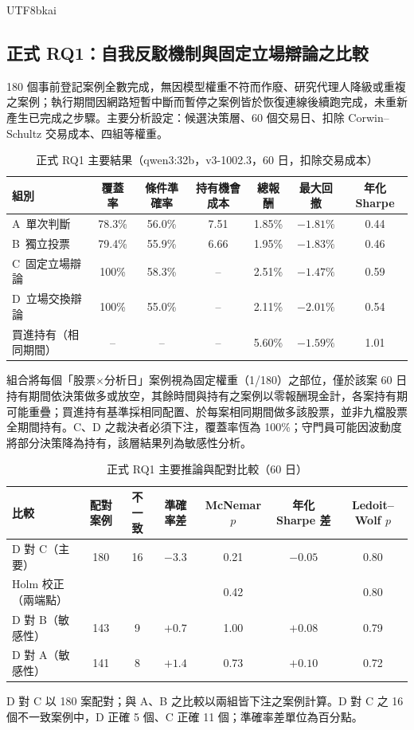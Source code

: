 \documentclass[12pt,a4paper]{article}
\newcommand{\grp}[1]{\textsf{#1}}
\begin{document}
\begin{CJK}{UTF8}{bkai}
\subsection{正式 RQ1：自我反駁機制與固定立場辯論之比較}
\label{sec:formalresults}

180 個事前登記案例全數完成，無因模型權重不符而作廢、研究代理人降級或重複之案例；執行期間因網路短暫中斷而暫停之案例皆於恢復連線後續跑完成，未重新產生已完成之步驟。主要分析設定：候選決策層、60 個交易日、扣除 Corwin--Schultz 交易成本、四組等權重。

\begin{table}[H]
\centering\small
\caption{正式 RQ1 主要結果（qwen3:32b，v3-1002.3，60 日，扣除交易成本）}
\label{tab:formalmain}
\begin{tabular}{@{}lcccccc@{}}
\toprule
組別 & 覆蓋率 & 條件準確率 & 持有機會成本 & 總報酬 & 最大回撤 & 年化 Sharpe \\
\midrule
\grp{A}\ 單次判斷 & 78.3\% & 56.0\% & 7.51 & 1.85\% & $-1.81\%$ & 0.44 \\
\grp{B}\ 獨立投票 & 79.4\% & 55.9\% & 6.66 & 1.95\% & $-1.83\%$ & 0.46 \\
\grp{C}\ 固定立場辯論 & 100\% & 58.3\% & -- & 2.51\% & $-1.47\%$ & 0.59 \\
\grp{D}\ 立場交換辯論 & 100\% & 55.0\% & -- & 2.11\% & $-2.01\%$ & 0.54 \\
\midrule
買進持有（相同期間） & -- & -- & -- & 5.60\% & $-1.59\%$ & 1.01 \\
\bottomrule
\end{tabular}
\par\smallskip
\raggedright\footnotesize 組合將每個「股票×分析日」案例視為固定權重（1/180）之部位，僅於該案 60 日持有期間依決策做多或放空，其餘時間與持有之案例以零報酬現金計，各案持有期可能重疊；買進持有基準採相同配置、於每案相同期間做多該股票，並非九檔股票全期間持有。\grp{C}、\grp{D} 之裁決者必須下注，覆蓋率恆為 100\%；守門員可能因波動度將部分決策降為持有，該層結果列為敏感性分析。
\end{table}

\begin{table}[H]
\centering\footnotesize
\caption{正式 RQ1 主要推論與配對比較（60 日）}
\label{tab:formaltests}
\begin{tabular}{@{}lcccccc@{}}
\toprule
比較 & 配對案例 & 不一致 & 準確率差 & McNemar $p$ & 年化 Sharpe 差 & Ledoit--Wolf $p$ \\
\midrule
\grp{D} 對 \grp{C}（主要） & 180 & 16 & $-3.3$ & 0.21 & $-0.05$ & 0.80 \\
\quad Holm 校正（兩端點） & & & & 0.42 & & 0.80 \\
\grp{D} 對 \grp{B}（敏感性） & 143 & 9 & $+0.7$ & 1.00 & $+0.08$ & 0.79 \\
\grp{D} 對 \grp{A}（敏感性） & 141 & 8 & $+1.4$ & 0.73 & $+0.10$ & 0.72 \\
\bottomrule
\end{tabular}
\par\smallskip
\raggedright\footnotesize \grp{D} 對 \grp{C} 以 180 案配對；與 \grp{A}、\grp{B} 之比較以兩組皆下注之案例計算。\grp{D} 對 \grp{C} 之 16 個不一致案例中，\grp{D} 正確 5 個、\grp{C} 正確 11 個；準確率差單位為百分點。
\end{table}


\end{CJK}
\end{document}
